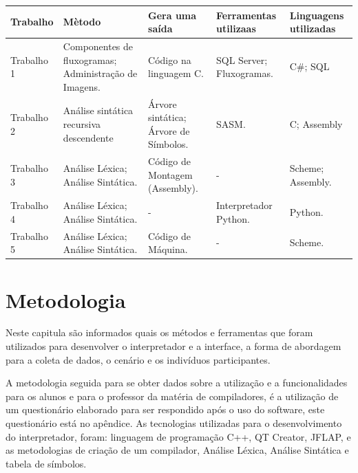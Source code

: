 \documentclass[12pt,oneside,a4paper,chapter=TITLE,section=TITLE,sumario=tradicional]{abntex2}
\begin{document}
\begin{quadro}[htb]
    \centering
    \vspace{0.5cm}
    \begin{tabular}{|p{3.0cm}|p{3.0cm}|p{3.0cm}|p{3.0cm}|p{3.0cm}|}
        \hline
        \textbf{Trabalho} & \textbf{Mètodo} & \textbf{Gera uma saída} & \textbf{Ferramentas utilizaas} & \textbf{Linguagens utilizadas} \\ 
        \hline\hline
        Trabalho 1 & Componentes de fluxogramas; Administração de Imagens. & Código na linguagem C.   &  SQL Server; Fluxogramas. & C\#; SQL    \\ \hline 
        Trabalho 2 & Análise sintática recursiva descendente    & Árvore sintática; Árvore de Símbolos.   & SASM.  & C; Assembly  \\ \hline
        Trabalho 3 & Análise Léxica;  Análise Sintática.   & Código de Montagem (Assembly).  &  -  & Scheme; Assembly.  \\ \hline
        Trabalho 4 & Análise Léxica;  Análise Sintática.   & -   &  Interpretador Python.  & Python.   \\ \hline
        Trabalho 5 & Análise Léxica;  Análise Sintática.   &  Código de Máquina.   & -   & Scheme.   \\ \hline
    \end{tabular}

    
\end{quadro}



\chapter{Metodologia}
\label{cap:metodologia}

Neste capitula são informados quais os métodos e ferramentas que foram utilizados para desenvolver o interpretador e a interface, a forma de abordagem para a coleta de dados, o cenário e os indivíduos participantes.

A metodologia seguida para se obter dados sobre a utilização e a funcionalidades para os alunos e para o professor da matéria de compiladores, é a utilização de um questionário elaborado para ser respondido após o uso do software, este questionário está no apêndice.
As tecnologias utilizadas para o desenvolvimento do interpretador, foram: linguagem de programação C++, QT Creator, JFLAP, e as metodologias de criação de um compilador, Análise Léxica, Análise Sintática e tabela de símbolos.  
\end{document}
